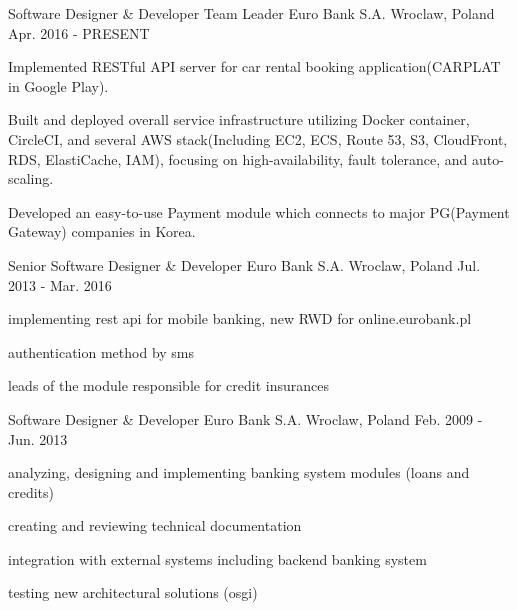 

\begin{cventries}

  \cventry
    {Software Designer \& Developer \/ Team Leader} %
    {Euro Bank S.A.} %
    {Wroclaw, Poland} %
    {Apr. 2016 - PRESENT} %
    {
      \begin{cvitems} %
        \item {Implemented RESTful API server for car rental booking application(CARPLAT in Google Play).}
        \item {Built and deployed overall service infrastructure utilizing Docker container, CircleCI, and several AWS stack(Including EC2, ECS, Route 53, S3, CloudFront, RDS, ElastiCache, IAM), focusing on high-availability, fault tolerance, and auto-scaling.}
        \item {Developed an easy-to-use Payment module which connects to major PG(Payment Gateway) companies in Korea.}
      \end{cvitems}
    }

  \cventry
    {Senior Software Designer \& Developer} %
    {Euro Bank S.A.} %
    {Wroclaw, Poland} %
    {Jul. 2013 - Mar. 2016} %
    {
      \begin{cvitems} %
        \item {implementing rest api for mobile banking, new RWD for online.eurobank.pl}
        \item {authentication method by sms}
        \item {leads of the module responsible for credit insurances}
      \end{cvitems}
    }

  \cventry
    {Software Designer \& Developer} %
    {Euro Bank S.A.} %
    {Wroclaw, Poland} %
    {Feb. 2009 - Jun. 2013} %
    {
      \begin{cvitems} %
        \item {analyzing, designing and implementing banking system modules (loans and credits)}
        \item {creating and reviewing technical documentation}
        \item {integration with external systems including backend banking system}
        \item {testing new architectural solutions (osgi)}
      \end{cvitems}
    }



\end{cventries}
